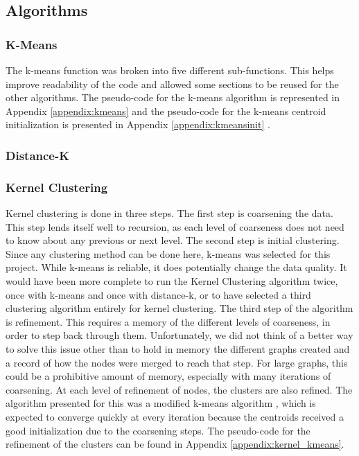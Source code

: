 \documentclass[12pt]{article}
\begin{document}
\subsection{Algorithms}

\subsubsection{K-Means}
The k-means function was broken into five different sub-functions. This helps improve readability of the code and allowed some sections to be reused for the other algorithms. The pseudo-code for the k-means algorithm is represented in Appendix \ref{appendix:kmeans} and the pseudo-code for the k-means centroid initialization is presented in Appendix \ref{appendix:kmeansinit} \cite{kmeans}.

\subsubsection{Distance-K}


\subsubsection{Kernel Clustering}
Kernel clustering is done in three steps. The first step is coarsening the data. This step lends itself well to recursion, as each level of coarseness does not need to know about any previous or next level. \newline\newline
The second step is initial clustering. Since any clustering method can be done here, k-means was selected for this project. While k-means is reliable, it does potentially change the data quality. It would have been more complete to run the Kernel Clustering algorithm twice, once with k-means and once with distance-k, or to have selected a third clustering algorithm entirely for kernel clustering.
\newline\newline
The third step of the algorithm is refinement. This requires a memory of the different levels of coarseness, in order to step back through them. Unfortunately, we did not think of a better way to solve this issue other than to hold in memory the different graphs created and a record of how the nodes were merged to reach that step. For large graphs, this could be a prohibitive amount of memory, especially with many iterations of coarsening.
\newline\newline
At each level of refinement of nodes, the clusters are also refined. The algorithm presented for this was a modified k-means algorithm \cite{kmeans}, which is expected to converge quickly at every iteration because the centroids received a good initialization due to the coarsening steps. The pseudo-code for the refinement of the clusters can be found in Appendix \ref{appendix:kernel_kmeans}.
\end{document}
